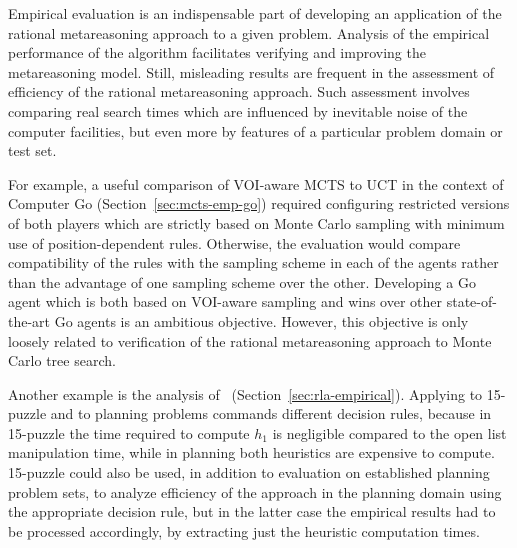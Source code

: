 Empirical evaluation is an indispensable part of developing an
application of the rational metareasoning approach to a given
problem. Analysis of the empirical performance of the algorithm
facilitates verifying and improving the metareasoning model.  Still,
misleading results are frequent in the assessment of efficiency of the
rational metareasoning approach. Such assessment involves comparing
real search times which are influenced by inevitable noise of the
computer facilities, but even more by features of a particular problem
domain or test set. 

For example, a useful comparison of VOI-aware MCTS
to UCT in the context of Computer Go (Section~\ref{sec:mcts-emp-go})
required configuring restricted versions of both players which are
strictly based on Monte Carlo sampling with minimum use of
position-dependent rules. Otherwise, the evaluation would compare
compatibility of the rules with the sampling scheme in each of the
agents rather than the advantage of one sampling scheme over the
other. Developing a Go agent which is both based on VOI-aware sampling
and wins over other state-of-the-art Go agents is an ambitious
objective. However, this objective is only loosely related to
verification of the rational metareasoning approach to Monte Carlo
tree search. 

Another example is the analysis of
\rationallazyastar~(Section~\ref{sec:rla-empirical}). Applying
\rationallazyastar to 15-puzzle and to planning problems commands
different decision rules, because in 15-puzzle the time required to
compute $h_1$ is negligible compared to the open list manipulation time,
while in planning both heuristics are expensive to compute. 15-puzzle
could also be used, in addition to evaluation on established planning
problem sets, to analyze efficiency of the approach  in the
planning domain using the appropriate decision rule, but in the latter
case the empirical results had to be processed accordingly,
by extracting just the heuristic computation times. 
